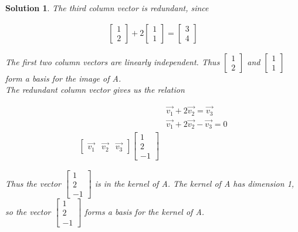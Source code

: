\documentclass{article}
\newtheorem*{solution}{Solution}
\begin{document}
\begin{solution}
The third column vector is redundant, since

\begin{align*}
\begin{bmatrix} 1 \\ 2 \end{bmatrix} + 2 \begin{bmatrix} 1 \\ 1 \end{bmatrix} = \begin{bmatrix} 3 \\ 4 \end{bmatrix} 
\end{align*}

The first two column vectors are linearly independent. Thus $\begin{bmatrix} 1 \\ 2 \end{bmatrix}$ and $\begin{bmatrix} 1 \\ 1 \end{bmatrix}$ form a basis for the image of A. \\ 

The redundant column vector gives us the relation

\begin{align*}
& \vec{v_{1}} + 2 \vec{v_{2}} = \vec{v_{3}} \\
& \vec{v_{1}} + 2 \vec{v_{2}} - \vec{v_{3}} = 0 \\
\begin{bmatrix} \vec{v_{1}} & \vec{v_{2}} & \vec{v_{3}} \end{bmatrix} \begin{bmatrix} 1 \\ 2 \\ -1 \end{bmatrix}
\end{align*}

Thus the vector $\begin{bmatrix} 1 \\ 2 \\ -1 \end{bmatrix}$ is in the kernel of A. The kernel of A has dimension 1, so the vector $\begin{bmatrix} 1 \\ 2 \\ -1 \end{bmatrix}$ forms a basis for the kernel of A.

\end{solution}
\end{document}

